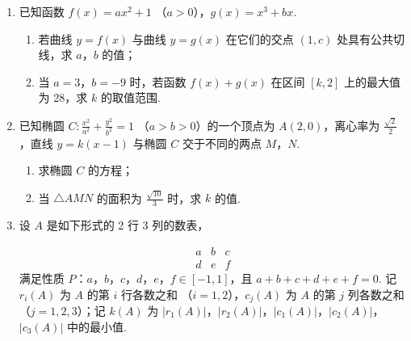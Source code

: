 \begin{description}
\begin{enumerate}[leftmargin=5pt]
\begin{enumerate}
\item 试估计厨余垃圾投放正确的概率；
\item 试估计生活垃圾投放错误的概率；
\item 假设厨余垃圾在“厨余垃圾”箱，“可回收物”箱，“其他垃圾”箱的投放量分别为 \(a\)，\(b\)，\(c\)，其中 \(a > 0\)，\(a + b + c = 600\). 当数据 \(a\)，\(b\)，\(c\) 的方差 \(s^2\) 最大时，写出 \(a\)，\(b\)，\(c\) 的值（结论不要求证明），并求此时 \(s^2\) 的值.
\end{enumerate}

（注：\(s^2 = \frac{1}{n}\left[(x_1 - \overline{x})^2 + (x_2 - \overline{x})^2 + \cdots + (x_n - \overline{x})^2\right]\)，其中 \(\overline{x}\) 为 \(x_1\)，\(x_2\)，\(\cdots\)，\(x_n\) 的平均数）

        \item 已知函数 \(f(x) = ax^2 + 1\) （\(a > 0\)），\(g(x) = x^3 + bx\).
\begin{enumerate}
\item 若曲线 \(y = f(x)\) 与曲线 \(y = g(x)\) 在它们的交点 \((1, c)\) 处具有公共切线，求 \(a\)，\(b\) 的值；
\item 当 \(a = 3\)，\(b = -9\) 时，若函数 \(f(x) + g(x)\) 在区间 \([k, 2]\) 上的最大值为 28，求 \(k\) 的取值范围.
\end{enumerate}

        \item 已知椭圆 \(C: \frac{x^2}{a^2} + \frac{y^2}{b^2} = 1\) （\(a > b > 0\)）的一个顶点为 \(A(2, 0)\)，离心率为 \(\frac{\sqrt{2}}{2}\)，直线 \(y = k(x - 1)\) 与椭圆 \(C\) 交于不同的两点 \(M\)，\(N\).

\begin{enumerate}
\item 求椭圆 \(C\) 的方程；
\item 当 \(\triangle AMN\) 的面积为 \(\frac{\sqrt{10}}{3}\) 时，求 \(k\) 的值.
\end{enumerate}

        \item 设 \(A\) 是如下形式的 2 行 3 列的数表，

\[
\begin{array}{ccc}

a & b & c \\
d & e & f

\end{array}
\]满足性质 \(P\)：\(a\)，\(b\)，\(c\)，\(d\)，\(e\)，\(f \in [-1, 1]\)，且 \(a + b + c + d + e + f = 0\).
记 \(r_i(A)\) 为 \(A\) 的第 \(i\) 行各数之和 （\(i = 1, 2\)），\(c_j(A)\) 为 \(A\) 的第 \(j\) 列各数之和 （\(j = 1, 2, 3\)）；记 \(k(A)\) 为 \(|r_1(A)|\)，\(|r_2(A)|\)，\(|c_1(A)|\)，\(|c_2(A)|\)，\(|c_3(A)|\) 中的最小值.


\end{enumerate}
\end{description}
